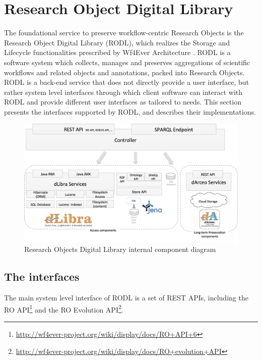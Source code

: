 \section{Research Object Digital Library}
\label{sec:rodl}


The foundational service to preserve workflow-centric Research Objects is the Research Object Digital Library (RODL), which realizes the Storage and Lifecycle functionalities prescribed by Wf4Ever Architecture \cite{w4fever_d132}. RODL is a software system which collects, manages and preserves aggregations of scientific workflows and related objects and annotations, packed into Research Objects. RODL is a back-end service that does not directly provide a user interface, but rather system level interfaces through which client software can interact with RODL and provide different user interfaces as tailored to needs. This section presents the interfaces supported by RODL, and describes their implementations.

\begin{figure}[!hb]
\centering
\includegraphics[width=\textwidth]{Figures/RODL-new.png}
\caption{Research Objects Digital Library internal component diagram}
\label{RODL}
\end{figure}

\subsection{The interfaces}

The main system level interface of RODL is a set of REST APIs, including the RO API\footnote{\url{http://wf4ever-project.org/wiki/display/docs/RO+API+6}} and the RO Evolution API\footnote{\url{http://wf4ever-project.org/wiki/display/docs/RO+evolution+API}}.

